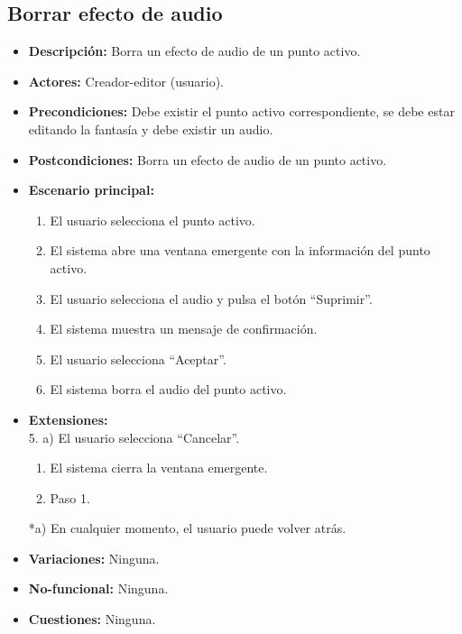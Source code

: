 \documentclass[12pt,letterpaper]{article}
\begin{document}
\subsection{Borrar efecto de audio}
\begin{itemize}
	\item \textbf{Descripción:} Borra un efecto de audio de un punto activo.
	\item \textbf{Actores:} Creador-editor (usuario).
	\item \textbf{Precondiciones:} Debe existir el punto activo correspondiente, se debe estar editando la fantasía y debe existir un audio.
	\item \textbf{Postcondiciones:} Borra un efecto de audio de un punto activo.
	\item \textbf{Escenario principal:}
	\begin{enumerate}
		\item El usuario selecciona el punto activo.
		\item El sistema abre una ventana emergente con la información del punto activo.
		\item El usuario selecciona el audio y pulsa el botón ``Suprimir''.
		\item El sistema muestra un mensaje de confirmación.
		\item El usuario selecciona ``Aceptar''.
		\item El sistema borra el audio del punto activo.
	\end{enumerate}
	\item \textbf{Extensiones:} \\ 5. a) El usuario selecciona ``Cancelar''.
	\begin{enumerate}
		\item El sistema cierra la ventana emergente.
		\item Paso 1.
	\end{enumerate}
	*a) En cualquier momento, el usuario puede volver atrás.
	\item \textbf{Variaciones:} Ninguna.
	\item \textbf{No-funcional:} Ninguna.
	\item \textbf{Cuestiones:} Ninguna.
\end{itemize}
\end{document}
